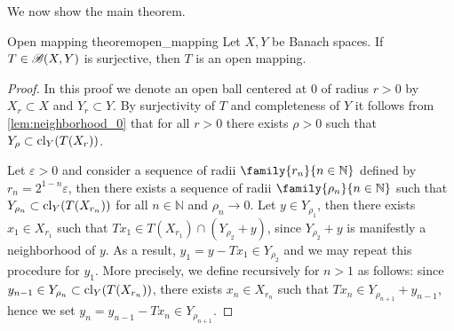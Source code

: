 We now show the main theorem.
\begin{theorem}{Open mapping theorem}{open_mapping}
    Let \(X, Y\) be Banach spaces. If \(T \in \mathscr{B}(X, Y)\) is surjective, then \(T\) is an open mapping.
\end{theorem}
\begin{proof}
    In this proof we denote an open ball centered at 0 of radius \(r > 0\) by \(X_r \subset X\) and \(Y_r \subset Y\). By surjectivity of \(T\) and completeness of \(Y\) it follows from \cref{lem:neighborhood_0} that for all \(r > 0\) there exists \(\rho > 0\) such that \(Y_\rho \subset \operatorname{cl}_Y(T(X_r))\).

    Let \(\varepsilon > 0\) and consider a sequence of radii \(\family{r_n}{n\in \mathbb{N}}\) defined by \(r_n = 2^{1-n}\varepsilon\), then there exists a sequence of radii \(\family{\rho_n}{n\in \mathbb{N}}\) such that \(Y_{\rho_n} \subset \operatorname{cl}_Y(T(X_{r_n}))\) for all \(n \in \mathbb{N}\) and \(\rho_n \to 0\). Let \(y \in Y_{\rho_1}\), then there exists \(x_1 \in X_{r_1}\) such that \(Tx_1 \in T(X_{r_1}) \cap (Y_{\rho_2} + y)\), since \(Y_{\rho_2} + y\) is manifestly a neighborhood of \(y\). As a result, \(y_1 = y - Tx_1 \in Y_{\rho_2}\) and we may repeat this procedure for \(y_1\). More precisely, we define recursively for \(n > 1\) as follows: since \(y_{n-1} \in Y_{\rho_n} \subset \operatorname{cl}_Y(T(X_{r_n}))\), there exists \(x_n \in X_{r_n}\) such that \(Tx_n \in Y_{\rho_{n+1}} + y_{n-1}\), hence we set \(y_n = y_{n-1} - Tx_n \in Y_{\rho_{n+1}}\).


\end{proof}
